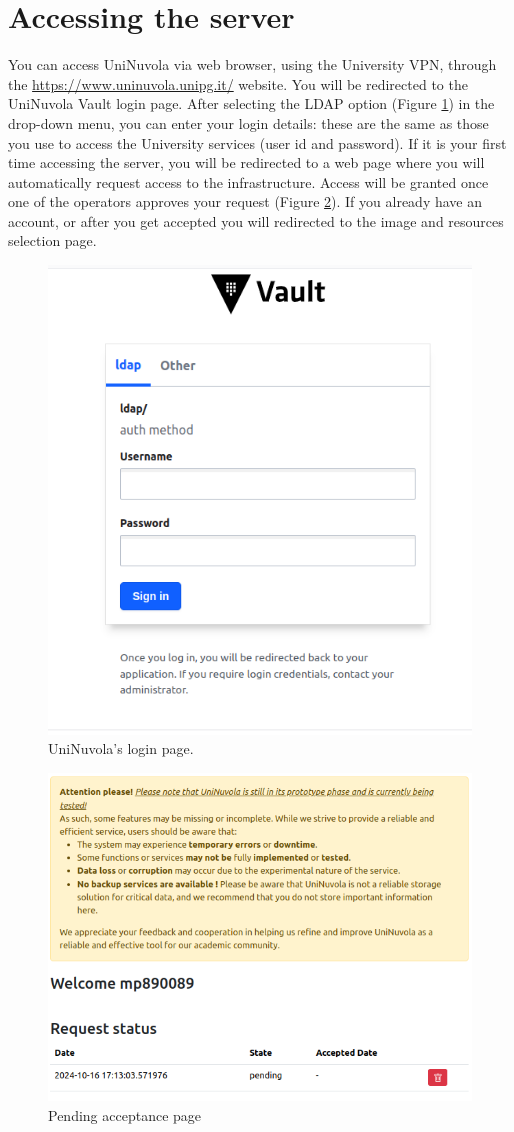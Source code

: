 \section{Accessing the server}

You can access UniNuvola via web browser, using the University VPN, through the
\href{https://www.uninuvola.unipg.it/}{https://www.uninuvola.unipg.it/} website. You will be redirected to the UniNuvola
Vault login page. After selecting the LDAP option (Figure \ref{fig:login}) in the drop-down menu, you can enter your
login details: these are the same as those you use to access the University services (user id and password). If it is
your first time accessing the server, you will be redirected to a web page  where you will automatically request access
to the infrastructure. Access will be granted once one of the operators approves your request (Figure
\ref{fig:pending}). If you already have an account, or after you get accepted you will redirected to the image and
resources selection page.


\begin{figure}[!ht]
    \centering
    \includegraphics[width=0.5\linewidth]{img/login_page.png}
    \caption{UniNuvola's login page.}
    \label{fig:login}
\end{figure}



\begin{figure}[!ht]
    \centering
    \includegraphics[width=0.5\linewidth]{img/request_page.png}
    \caption{Pending acceptance page}
    \label{fig:pending}
\end{figure}

